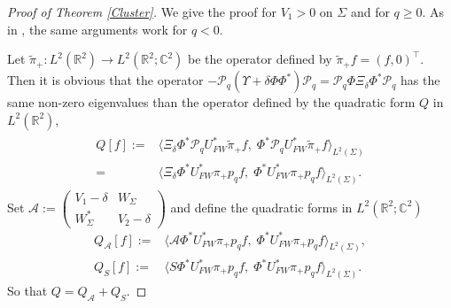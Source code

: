 \documentclass[11pt,a4paper,reqno,oneside]{amsproc}
\def \cc {{\mathbb C}}
\numberwithin{equation}{section}
\def \cc {{\mathbb{C}}}
\begin{document}
\begin{proof}[Proof of Theorem \ref{Cluster}]
We give the proof for $V_1>0$ on $\Sigma$ and for $q\geq 0$. As in \cite{BM}, the same arguments work for $q<0$.

Let $\tilde \pi_+: L^2(\mathbb R^2)\to L^2(\mathbb R^2;\mathbb C^2)$ be the operator defined by $\tilde \pi_+ f=(f,0)^\intercal$. Then it is obvious that the operator  $-\mathcal P_q(\Upsilon + \delta \Phi \Phi^{*})\mathcal P_q= \mathcal P_q\Phi \Xi_{\delta} \Phi^{*}\mathcal P_q$ has the same non-zero eigenvalues than the operator defined by the quadratic form  $Q$ in $L^{2}(\mathbb{R}^{2})$, 
\begin{align}\label{Def Q}
\begin{split}
Q[f]:=&\bigl\langle \Xi_{\delta}\Phi^{*}\mathcal{P}_q U_{FW}^*\tilde\pi_+ f,\;\Phi^{*}\mathcal{P}_q U_{FW}^*\tilde\pi_+ f \bigr\rangle_{L^2(\Sigma)}\\
=&\bigl\langle \Xi_{\delta} \Phi^{*}U_{FW}^*\pi_+p_qf ,\;\Phi^{*}U_{FW}^*\pi_+p_qf \bigr\rangle_{L^2(\Sigma)}.
\end{split}
\end{align}
Set $\mathcal A:=\begin{pmatrix}
V_{1} -\delta & W_\Sigma\\
W^*_\Sigma & V_{2} - \delta
\end{pmatrix}$ and define  the quadratic forms in $L^2(\mathbb R^2;\cc^2)$
\begin{align*}
Q_{\mathcal A}[f]:=&\bigl\langle \mathcal A \Phi^{*}U_{FW}^*\pi_+p_qf ,\;\Phi^{*}U_{FW}^*\pi_+p_qf \bigr\rangle_{L^2(\Sigma)},\\
Q_S[f]:=&\bigl\langle S\Phi^{*}U_{FW}^*\pi_+p_qf ,\;\Phi^{*}U_{FW}^*\pi_+p_qf \bigr\rangle_{L^2(\Sigma)}.
\end{align*}
So that $Q=Q_{\mathcal A}+Q_S$.



\end{proof}
\end{document}
